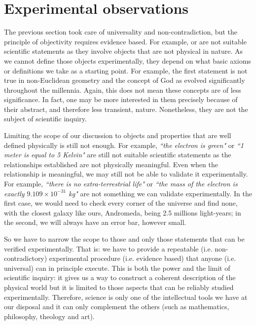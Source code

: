 \documentclass[11pt,letterpaper,fleqn]{memoir} %
\begin{document}
\section{Experimental observations}

The previous section took care of universality and non-contradiction, but the principle of objectivity requires evidence based. For example,  or  are not suitable scientific statements as they involve objects that are not physical in nature. As we cannot define those objects experimentally, they depend on what basic axioms or definitions we take as a starting point. For example, the first statement is not true in non-Euclidean geometry and the concept of God as evolved significantly throughout the millennia. Again, this does not mean these concepts are of less significance. In fact, one may be more interested in them precisely because of their abstract, and therefore less transient, nature. Nonetheless, they are not the subject of scientific inquiry.

Limiting the scope of our discussion to objects and properties that are well defined physically is still not enough. For example, \emph{``the electron is green"} or \emph{``1 meter is equal to 5 Kelvin"} are still not suitable scientific statements as the relationships established are not physically meaningful. Even when the relationship is meaningful, we may still not be able to validate it experimentally. For example, \emph{``there is no extra-terrestrial life"} or \emph{``the mass of the electron is exactly $9.109 \times 10^{-31}$ kg"} are not something we can validate experimentally. In the first case, we would need to check every corner of the universe and find none, with the closest galaxy like ours, Andromeda, being 2.5 millions light-years; in the second, we will always have an error bar, however small.

So we have to narrow the scope to those and only those statements that can be verified experimentally. That is: we have to provide a repeatable (i.e. non-contradictory) experimental procedure (i.e. evidence based) that anyone (i.e. universal) can in principle execute. This is both the power and the limit of scientific inquiry: it gives us a way to construct a coherent description of the physical world but it is limited to those aspects that can be reliably studied experimentally. Therefore, science is only one of the intellectual tools we have at our disposal and it can only complement the others (such as mathematics, philosophy, theology and art).
\end{document}
